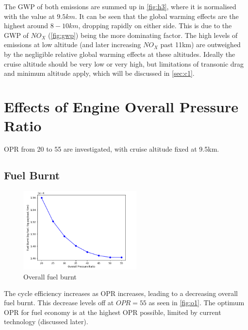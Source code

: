 \documentclass[12pt, a4paper]{article}
\begin{document}
The GWP of both emissions are summed up in \autoref{fig:h3}, where it is normalised with the value at $9.5km$. It can be seen that the global warming effects are the  highest around $8-10km$, dropping rapidly on either side. This is due to the GWP of $NO_X$ (\autoref{fig:gwp}) being the more dominating factor. The high levels of emissions at low altitude (and later increasing $NO_X$ past 11km) are outweighed by the negligible relative global warming effects at these altitudes. Ideally the cruise altitude should be very low or very high, but limitations of transonic drag and minimum altitude apply, which will be discussed in \ref{sec:c1}.

\section{Effects of Engine Overall Pressure Ratio}
OPR from 20 to 55 are investigated, with cruise altitude fixed at 9.5km.
\subsection{Fuel Burnt}
\begin{figure}
	\centering
	\includegraphics[width=0.55\textwidth]{../Plots/opr fuel}
	\caption{Overall fuel burnt}
	\label{fig:ofuel}
\end{figure}

The cycle efficiency increases as OPR increases, leading to a  decreasing overall fuel burnt. This decrease levels off at $OPR=55$ as seen in \autoref{fig:o1}. The optimum OPR for fuel economy is at the highest OPR possible, limited by current technology (discussed later).
\end{document}
